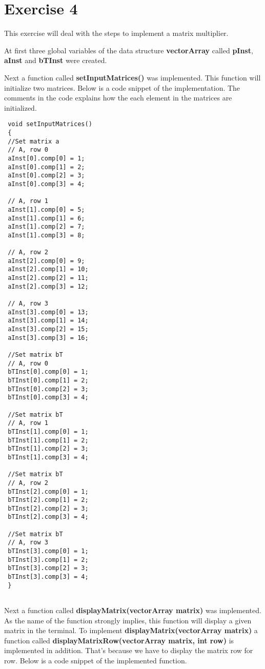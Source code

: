 
\chapter{Exercise 4}

This exercise will deal with the steps to implement a matrix multiplier. 

At first three global variables of the data structure \textbf{vectorArray} called \textbf{pInst}, \textbf{aInst} and \textbf{bTInst} were created. 

Next a function called \textbf{setInputMatrices()} was implemented. This function will initialize two matrices. Below is a code snippet of the implementation. The comments in the code explains how the each element in the matrices are initialized. 

 \begin{lstlisting}
 void setInputMatrices()
 {
 //Set matrix a
 // A, row 0
 aInst[0].comp[0] = 1;
 aInst[0].comp[1] = 2;
 aInst[0].comp[2] = 3;
 aInst[0].comp[3] = 4;
 
 // A, row 1
 aInst[1].comp[0] = 5;
 aInst[1].comp[1] = 6;
 aInst[1].comp[2] = 7;
 aInst[1].comp[3] = 8;
 
 // A, row 2
 aInst[2].comp[0] = 9;
 aInst[2].comp[1] = 10;
 aInst[2].comp[2] = 11;
 aInst[2].comp[3] = 12;
 
 // A, row 3
 aInst[3].comp[0] = 13;
 aInst[3].comp[1] = 14;
 aInst[3].comp[2] = 15;
 aInst[3].comp[3] = 16;
 
 //Set matrix bT
 // A, row 0
 bTInst[0].comp[0] = 1;
 bTInst[0].comp[1] = 2;
 bTInst[0].comp[2] = 3;
 bTInst[0].comp[3] = 4;
 
 //Set matrix bT
 // A, row 1
 bTInst[1].comp[0] = 1;
 bTInst[1].comp[1] = 2;
 bTInst[1].comp[2] = 3;
 bTInst[1].comp[3] = 4;
 
 //Set matrix bT
 // A, row 2
 bTInst[2].comp[0] = 1;
 bTInst[2].comp[1] = 2;
 bTInst[2].comp[2] = 3;
 bTInst[2].comp[3] = 4;
 
 //Set matrix bT
 // A, row 3
 bTInst[3].comp[0] = 1;
 bTInst[3].comp[1] = 2;
 bTInst[3].comp[2] = 3;
 bTInst[3].comp[3] = 4;
 }
 
 \end{lstlisting}
 
 Next a function called \textbf{displayMatrix(vectorArray matrix)} was implemented. 
 As the name of the function strongly implies, this function will display a given matrix in the  terminal. To implement \textbf{displayMatrix(vectorArray matrix)} a function called \textbf{displayMatrixRow(vectorArray matrix, int row)} is implemented in addition. That's because we have to display the matrix row for row.
 Below is a code snippet of the implemented function.
 
